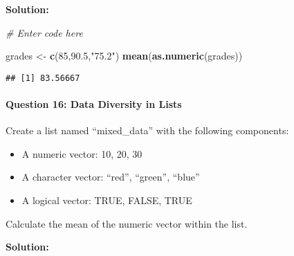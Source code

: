 \documentclass[
]{article}
\newenvironment{Shaded}{\begin{snugshade}}{\end{snugshade}}
\newcommand{\AttributeTok}[1]{\textcolor[rgb]{0.13,0.29,0.53}{#1}}
\newcommand{\CommentTok}[1]{\textcolor[rgb]{0.56,0.35,0.01}{\textit{#1}}}
\newcommand{\ConstantTok}[1]{\textcolor[rgb]{0.56,0.35,0.01}{#1}}
\newcommand{\DecValTok}[1]{\textcolor[rgb]{0.00,0.00,0.81}{#1}}
\newcommand{\FloatTok}[1]{\textcolor[rgb]{0.00,0.00,0.81}{#1}}
\newcommand{\FunctionTok}[1]{\textcolor[rgb]{0.13,0.29,0.53}{\textbf{#1}}}
\newcommand{\NormalTok}[1]{#1}
\newcommand{\OtherTok}[1]{\textcolor[rgb]{0.56,0.35,0.01}{#1}}
\newcommand{\SpecialCharTok}[1]{\textcolor[rgb]{0.81,0.36,0.00}{\textbf{#1}}}
\newcommand{\StringTok}[1]{\textcolor[rgb]{0.31,0.60,0.02}{#1}}
\begin{document}
\textbf{Solution:}

\begin{Shaded}
\begin{Highlighting}[]
\CommentTok{\# Enter code here}

\NormalTok{grades }\OtherTok{\textless{}{-}} \FunctionTok{c}\NormalTok{(}\DecValTok{85}\NormalTok{,}\FloatTok{90.5}\NormalTok{,}\StringTok{"75.2"}\NormalTok{)}
\FunctionTok{mean}\NormalTok{(}\FunctionTok{as.numeric}\NormalTok{(grades))}
\end{Highlighting}
\end{Shaded}

\begin{verbatim}
## [1] 83.56667
\end{verbatim}

\hypertarget{question-16-data-diversity-in-lists}{%
\paragraph{Question 16: Data Diversity in
Lists}\label{question-16-data-diversity-in-lists}}

Create a list named ``mixed\_data'' with the following components:

\begin{itemize}
\item
  A numeric vector: 10, 20, 30
\item
  A character vector: ``red'', ``green'', ``blue''
\item
  A logical vector: TRUE, FALSE, TRUE
\end{itemize}

Calculate the mean of the numeric vector within the list.

\textbf{Solution:}

\begin{Shaded}
\end{Shaded}
\end{document}
